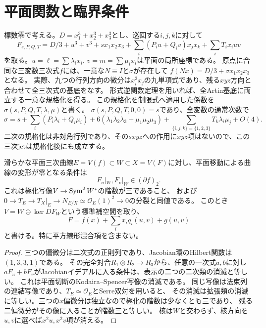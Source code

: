 \section{平面関数と臨界条件}
標数零で考える。$D=x_1^3+x_2^3+x_3^3$とし、巡回する$i,j,k$に対して
\begin{equation}\label{mh:family}
 F_{s,P,Q,T}=D/3+u^3+v^3+s x_1x_2x_3+
 \sum_i(P_i u+Q_i v)x_jx_k+\sum_i T_i x_iuv
\end{equation}
を取る。$u=\ell=\sum\lambda_i x_i$, $v=m=\sum\mu_i x_i$は平面の局所座標である。
原点に合同な三変数三次式$f$には、一意な$N\equiv I$と$\sigma$が存在して
$f(Nx)=D/3+\sigma x_1x_2x_3$となる。
実際、九つの行列方向の微分は$x_i^2x_j$の九単項式であり、残る$xyz$方向と合わせて全三次式の基底をなす。
形式逆関数定理を用いれば、全Artin基底に両立する一意な規格化を得る。
この規格化を制限式へ適用した係数を$\sigma(s,P,Q,T,\lambda,\mu)$と書く。
$\sigma(s,P,Q,T,0,0)=s$であり、全変数の通常次数で
\begin{equation}\label{mh:jet}
 \sigma=s+\sum_i(P_i\lambda_i+Q_i\mu_i)
 +6(\lambda_1\lambda_2\lambda_3+\mu_1\mu_2\mu_3)
 +\sum_{\{i,j,k\}=\{1,2,3\}}T_k\lambda_i\mu_j+O(4).
\end{equation}
二次の規格化は非対角行列であり、その$sxyz$への作用に$xyz$項はないので、この三次jetは規格化後にも成立する。

\begin{proposition}[内在的臨界条件]\label{mh:intrinsic}
滑らかな平面三次曲線$E=V(f)\subset W\subset X=V(F)$に対し、平面移動による曲線の変形が零となる条件は
\[
 F_u|_W,F_v|_W\in (\partial f)_2.
\]
これは極化写像$V\to\operatorname{Sym}^2 W^*$の階数が三であること、
および$0\to T_E\to T_X|_E\to N_{E/X}\simeq\mathcal O_E(1)^2\to0$の分裂と同値である。
このとき$V=W\oplus\ker DF_W$という標準補空間を取り、
\[
 F=f(x)+\sum_i x_iq_i(u,v)+g(u,v)
\]
と書ける。特に平方線形混合項を含まない。
\end{proposition}
\begin{proof}
三つの偏微分は二次式の正則列であり、Jacobian環のHilbert関数は$(1,3,3,1)$である。
その完全対合$R_1\otimes R_2\to R_3$から、任意の一次式$a,b$に対し
$aF_u+bF_v$がJacobianイデアルに入る条件は、表示の二つの二次類の消滅と等しい。
これは平面切断のKodaira--Spencer写像の消滅である。
同じ写像は法束列の連結写像であり、$T_E\simeq\mathcal O_E$とSerre双対を用いると、
その消滅は拡張類の消滅に等しい。三つの$x$偏微分は独立なので極化の階数は少なくとも三であり、
残る二偏微分がその像に入ることが階数三と等しい。
核は$W$と交わらず、核方向を$u,v$に選べば$x^2u,x^2v$項が消える。
\end{proof}

